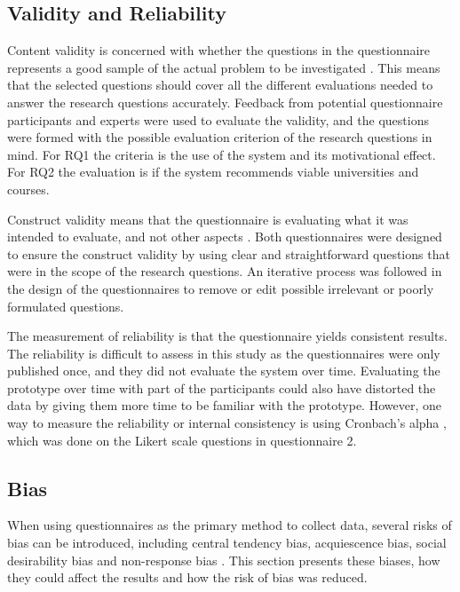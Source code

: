 \subsection{Validity and Reliability}

Content validity is concerned with whether the questions in the questionnaire represents a good sample of the actual problem to be investigated \cite{oates2005researching}. This means that the selected questions should cover all the different evaluations needed to answer the research questions accurately. Feedback from potential questionnaire participants and experts were used to evaluate the validity, and the questions were formed with the possible evaluation criterion of the research questions in mind. For RQ1 the criteria is the use of the system and its motivational effect. For RQ2 the evaluation is if the system recommends viable universities and courses.

Construct validity means that the questionnaire is evaluating what it was intended to evaluate, and not other aspects \cite{oates2005researching}. Both questionnaires were designed to ensure the construct validity by using clear and straightforward questions that were in the scope of the research questions. An iterative process was followed in the design of the questionnaires to remove or edit possible irrelevant or poorly formulated questions. 

The measurement of reliability is that the questionnaire yields consistent results. The reliability is difficult to assess in this study as the questionnaires were only published once, and they did not evaluate the system over time. Evaluating the prototype over time with part of the participants could also have distorted the data by giving them more time to be familiar with the prototype. However, one way to measure the reliability or internal consistency is using Cronbach's alpha \cite{bland1997statistics}, which was done on the Likert scale questions in questionnaire 2.

\subsection{Bias}

When using questionnaires as the primary method to collect data, several risks of bias can be introduced, including central tendency bias, acquiescence bias, social desirability bias and non-response bias \cite{furnham1986response}. This section presents these biases, how they could affect the results and how the risk of bias was reduced.  

